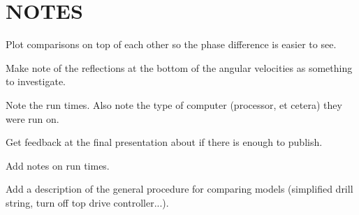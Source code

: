 \documentclass{lebook}
\begin{document}


\frontmatter{}
\pagestyle{cnpcusareportothermatter}

\tableofcontents{}
\listoffigures{}
\listoftables{}



\mainmatter{}
\pagestyle{cnpcusareportothermatter}




\chapter{NOTES}
\begin{bulletedlist}
	\item Plot comparisons on top of each other so the phase difference is easier to see.
	\item Make note of the reflections at the bottom of the angular velocities as something to investigate.
	\item Note the run times.  Also note the type of computer (processor, et cetera) they were run on.
	\item Get feedback at the final presentation about if there is enough to publish.
	\item Add notes on run times.
	\item Add a description of the general procedure for comparing models (simplified drill string, turn off top drive controller...).
\end{bulletedlist}








\appendix{}




%


\backmatter{}
\pagestyle{cnpcusareportothermatter}


\printglossary[type=main, title=Glossary]{}
\renewcommand*{\chaptertitle}{Glossary}

\printglossary[type=\acronymtype]
\renewcommand*{\chaptertitle}{Acronyms}

%

\glsaddallunused{}


\end{document}

